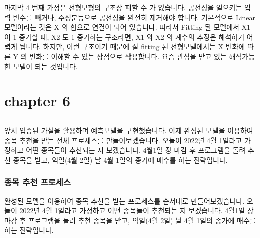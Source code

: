 \documentclass[letterpaper,10pt,english]{jupyterBook}
\begin{document}
\sphinxAtStartPar
마지막 4 번째 가정은 선형모형의 구조상 피할 수 가 없습니다. 공선성을 일으키는 입력 변수를 빼거나, 주성분등으로 공선성을 완전히 제거해야 합니다. 기본적으로 Linear 모델이라는 것은 X 의 합으로 연결이 되어 있습니다. 따라서 Fitting 된 모델에서 X1 이 1 증가할 때,  X2 도 1 증가하는 구조라면, X1 와 X2 의 계수의 추정은 해석하기 어렵게 됩니다. 하지만, 이런 구조이기 때문에 잘 fitting 된 선형모델에서는 X 변화에 따른 Y 의 변화를 이해할 수 있는 장점으로 작용합니다. 요즘 관심을 받고 있는 해석가능한 모델이 되는 것입니다.


\part{chapter 6}


\chapter{}
\label{\detokenize{chapter6/6.0.0_Effectiveness_Testing:id1}}\label{\detokenize{chapter6/6.0.0_Effectiveness_Testing::doc}}
\sphinxAtStartPar
앞서 입증된 가설을 활용하며 예측모델을 구현했습니다. 이제 완성된 모델을 이용하여 종목 추천을 받는 전체 프로세스를 만들어보겠습니다.
오늘이 2022년 4월 1일라고 가정하고 어떤 종목들이 추천되는 지 보겠습니다. 4월1일 장 마감 후 프로그램을 돌려 추천 종목을 받고, 익일(4월 2일) 날 4월 1일의 종가에 매수를 하는 전략입니다.


\section{종목 추천 프로세스}
\label{\detokenize{chapter6/6.1.1_Stock_Selection:id1}}\label{\detokenize{chapter6/6.1.1_Stock_Selection::doc}}
\sphinxAtStartPar
완성된 모델을 이용하여 종목 추천을 받는 프로세스를 순서대로 만들어보겠습니다.
오늘이 2022년 4월 1일라고 가정하고 어떤 종목들이 추천되는 지 보겠습니다. 4월1일 장 마감 후 프로그램을 돌려 추천 종목을 받고, 익일(4월 2일) 날 4월 1일의 종가에 매수를 하는 전략입니다.
\end{document}
